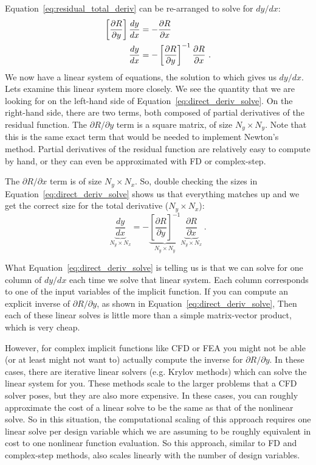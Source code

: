 \documentclass[conf]{new-aiaa}
\begin{document}
    Equation~\eqref{eq:residual_total_deriv} can be re-arranged to solve for $dy/dx$: 
    \begin{align}
        \left[\frac{\partial R}{\partial y}\right] \frac{dy}{dx}& = - \frac{\partial R}{\partial x} \notag \\
        \frac{dy}{dx} &= - \left[\frac{\partial R}{\partial y}\right]^{-1} \frac{\partial R}{\partial x} \ . \label{eq:direct_deriv_solve}
    \end{align}
    We now have a linear system of equations, the solution to which gives us $dy/dx$. 
    Lets examine this linear system more closely. 
    We see the quantity that we are looking for on the left-hand side of Equation~\eqref{eq:direct_deriv_solve}.
    On the right-hand side, there are two terms, both composed of partial derivatives of the residual function. 
    The $\partial R/\partial y$ term is a square matrix, of size $N_y \times N_y$. 
    Note that this is the same exact term that would be needed to implement Newton's method. 
    Partial derivatives of the residual function are relatively easy to compute by hand, or they can even be approximated with FD or complex-step. 

    The $\partial R/\partial x$ term is of size $N_y \times N_x$. 
    So, double checking the sizes in Equation~\eqref{eq:direct_deriv_solve} shows us that everything matches up and we get the correct size for the total derivative ($N_y \times N_x$): 
    \begin{equation}
        \underbrace{\frac{dy}{dx}}_{N_y \times N_x} = 
        - \underbrace{\left[\frac{\partial R}{\partial y}\right]^{-1}}_{N_y \times N_y} 
        \underbrace{\frac{\partial R}{\partial x}}_{N_y \times N_x} \ . \label{eq:direct_deriv_solve}
    \end{equation}

    What Equation~\eqref{eq:direct_deriv_solve} is telling us is that we can solve for one column of $dy/dx$ each time we solve that linear system. 
    Each column corresponds to one of the input variables of the implicit function. 
    If you can compute an explicit inverse of $\partial R/\partial y$, as shown in Equation~\eqref{eq:direct_deriv_solve},
    Then each of these linear solves is little more than a simple matrix-vector product, which is very cheap. 
    
    However, for complex implicit functions like CFD or FEA you might not be able (or at least might not want to) actually compute the inverse for $\partial R/\partial y$. 
    In these cases, there are iterative linear solvers (e.g. Krylov methods) which can solve the linear system for you. 
    These methods scale to the larger problems that a CFD solver poses, but they are also more expensive. 
    In these cases, you can roughly approximate the cost of a linear solve to be the same as that of the nonlinear solve. 
    So in this situation, the computational scaling of this approach requires one linear solve per design variable which we are assuming to be roughly equivalent in cost to one nonlinear function evaluation. 
    So this approach, similar to FD and complex-step methods, also scales linearly with the number of design variables. 
\end{document}
